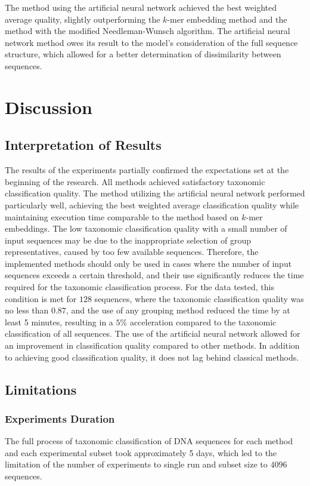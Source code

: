 \documentclass[pdflatex,sn-vancouver-num]{sn-jnl}%
\begin{document}
                The method using the artificial neural network achieved the best weighted average quality, slightly outperforming the $k$-mer embedding method and the method with the modified Needleman-Wunsch algorithm. The artificial neural network method owes its result to the model's consideration of the full sequence structure, which allowed for a better determination of dissimilarity between sequences.

    \section{Discussion}
        \subsection{Interpretation of Results}
            The results of the experiments partially confirmed the expectations set at the beginning of the research. All methods achieved satisfactory taxonomic classification quality. The method utilizing the artificial neural network performed particularly well, achieving the best weighted average classification quality while maintaining execution time comparable to the method based on $k$-mer embeddings. The low taxonomic classification quality with a small number of input sequences may be due to the inappropriate selection of group representatives, caused by too few available sequences. Therefore, the implemented methods should only be used in cases where the number of input sequences exceeds a certain threshold, and their use significantly reduces the time required for the taxonomic classification process. For the data tested, this condition is met for $128$ sequences, where the taxonomic classification quality was no less than $0.87$, and the use of any grouping method reduced the time by at least 5 minutes, resulting in a $5\%$ acceleration compared to the taxonomic classification of all sequences. The use of the artificial neural network allowed for an improvement in classification quality compared to other methods. In addition to achieving good classification quality, it does not lag behind classical methods.

        \subsection{Limitations}
            \subsubsection{Experiments Duration}
                The full process of taxonomic classification of DNA sequences for each method and each experimental subset took approximately 5 days, which led to the limitation of the number of experiments to single run and subset size to $4096$ sequences.
\end{document}
